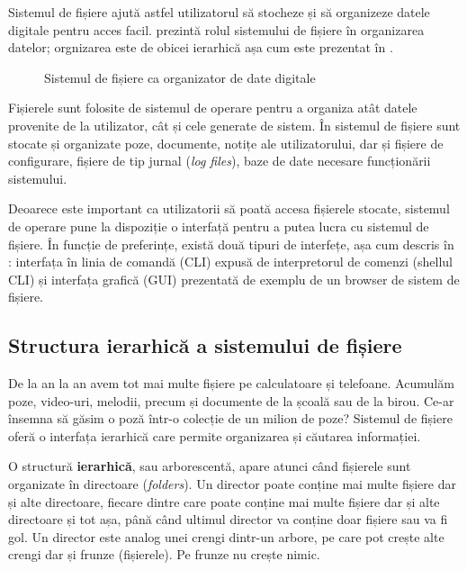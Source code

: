 Sistemul de fișiere ajută astfel utilizatorul să stocheze și să organizeze datele digitale pentru acces facil.  prezintă rolul sistemului de fișiere în organizarea datelor; orgnizarea este de obicei ierarhică așa cum este prezentat în .

\begin{figure}[htbp]
  \centering
  \def\svgwidth{0.5\columnwidth}
  
  \caption{Sistemul de fișiere ca organizator de date digitale}
  \label{fig:fs:def-fs}
\end{figure}

Fișierele sunt folosite de sistemul de operare pentru a organiza atât datele provenite de la utilizator, cât și cele generate de sistem. În sistemul de fișiere sunt stocate și organizate poze, documente, notițe ale utilizatorului, dar și fișiere de configurare, fișiere de tip jurnal (\textit{log files}), baze de date necesare funcționării sistemului.

Deoarece este important ca utilizatorii să poată accesa fișierele stocate, sistemul de operare pune la dispoziție o interfață pentru a putea lucra cu sistemul de fișiere. În funcție de preferințe, există două tipuri de interfețe, așa cum descris în : interfața în linia de comandă (CLI) expusă de interpretorul de comenzi (shellul CLI) și interfața grafică (GUI) prezentată de exemplu de un browser de sistem de fișiere.

\subsection{Structura ierarhică a sistemului de fișiere}
\label{sec:fs:filesystem}

De la an la an avem tot mai multe fișiere pe calculatoare și telefoane. Acumulăm poze, video-uri, melodii, precum și documente de la școală sau de la birou. Ce-ar însemna să găsim o poză într-o colecție de un milion de poze? Sistemul de fișiere oferă o interfața ierarhică care permite organizarea și căutarea informației.

O structură \textbf{ierarhică}, sau arborescentă, apare atunci când fișierele sunt organizate în directoare (\textit{folders}). Un director poate conține mai multe fișiere dar și alte directoare, fiecare dintre care poate conține mai multe fișiere dar și alte directoare și tot așa, până când ultimul director va conține doar fișiere sau va fi gol. Un director este analog unei crengi dintr-un arbore, pe care pot crește alte crengi dar și frunze (fișierele). Pe frunze nu crește nimic.

